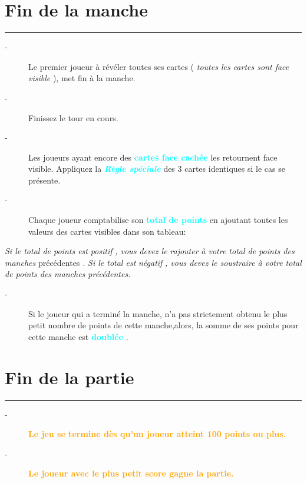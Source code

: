 \documentclass{article}%
\begin{document}
%
\sectionfont{\color{cyan}}%
\subsectionfont{\color{cyan}}%
\subsubsectionfont{\color{cyan}}%
\section{ Fin de la manche
}%
\label{sec:Findelamanche}%
\textcolor{cyan}{\rule{18cm}{0.07cm}}\break%
\begin{description}%
\item[{-} ]%
%
Le premier joueur à révéler toutes ses cartes (%
\textit{toutes les cartes sont face visible}%
), met fin à la manche.
%
\item[{-} ]%
%
 Finissez le tour en cours.
%
\item[{-} ]%
%
 Les joueurs ayant encore des %
\textcolor{cyan}{%
\textbf{cartes face cachée}%
}%
\textit{ }%
 les retournent face visible. Appliquez la %
\textcolor{cyan}{\textbf{\textit{Règle spéciale}}}%
\textit{ }%
 des 3 cartes identiques si le cas se présente.
%
\item[{-} ]%
%
 Chaque joueur comptabilise son %
\textcolor{cyan}{%
\textbf{total de points}%
}%
\textit{ }%
 en ajoutant toutes les valeurs des cartes visibles dans son tableau:
%
\end{description}%
\textit{ Si le total de points est }%
\textit{positif}%
\textit{, vous devez le }%
\textit{rajouter}%
\textit{ à votre total de points des manches }%
précédentes%
\textit{.
}%
\textit{ Si le total est }%
\textit{négatif}%
\textit{, vous devez le soustraire à votre total de points des manches précédentes.
}%
\begin{description}%
\item[{-} ]%
%
Si le joueur qui a terminé la manche, n’a pas strictement obtenu le plus petit nombre de points de cette manche,alors, la somme de ses points pour cette manche est %
\textcolor{cyan}{%
\textbf{doublée}%
}%
.
%
\end{description}

%
\sectionfont{\color{orange}}%
\subsectionfont{\color{orange}}%
\subsubsectionfont{\color{orange}}%
\section{ Fin de la partie
}%
\label{sec:Findelapartie}%
\textcolor{orange}{\rule{18cm}{0.07cm}}\break%
\begin{description}%
\item[{-} ]%
%
\textcolor{orange}{%
\textbf{Le jeu se termine dès qu’un joueur atteint 100 points ou plus.}%
}%

%
\item[{-} ]%
%
\textcolor{orange}{%
\textbf{Le joueur avec le plus petit score gagne la partie.}%
}%
\end{description}

%
\end{document}
